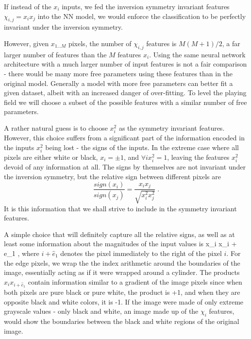 \documentclass{svproc}
\begin{document}
If instead of the $x_i$ inputs, we fed the inversion symmetry invariant features $\chi_{i,j} = x_i x_j$ into the NN model, we would enforce the classification to be perfectly invariant under the inversion symmetry.

However, given $x_{1 \ldots M}$ pixels, the number of $\chi_{i,j}$ features is $M(M+1)/2$, a far larger number of features than the $M$ features $x_i$. Using the same neural network architecture with a much larger number of input features is not a fair comparison - there would be many more free parameters using these features than in the original model. Generally a model with more free parameters can better fit a given dataset, albeit with an increased danger of over-fitting.
To level the playing field we will choose a subset of the possible features with a similar number of free parameters. 

A rather natural guess is to choose $x_i^2$ as the symmetry invariant features. However, this choice suffers from a significant part of the information encoded in the inputs $x_i^2$ being lost - the signs of the inputs. In the extreme case where all pixels are either white or black, $x_i = \pm 1$, and $\forall i x_i^2 = 1$, leaving the features $x_i^2$ devoid of any information at all. The signs by themselves are not invariant under the inversion symmetry, but the relative sign between different pixels are
\begin{equation}
\frac{sign(x_i)}{sign(x_j)} = \frac{x_i x_j}{\sqrt{x_i^2 x_j ^2}}
\; .
\end{equation}
It is this information that we shall strive to include in the symmetry invariant features.

A simple choice that will definitely capture all the relative signs, as well as at least some information about the magnitudes of the input values is
\be
x_i x_{i + {\hat e}_1}
\; ,
\ee
where $i + {\hat e}_1$ denotes the pixel immediately to the right of the pixel $i$. For the edge pixels, we wrap the the index arithmetic around the boundaries of the image, essentially acting as if it were wrapped around a cylinder. The products $x_i x_{i + {\hat e}_1}$ contain information similar to a gradient of the image pixels since when both pixels are pure black or pure white, the product is +1, and when they are opposite black and white colors, it is -1. If the image were made of only extreme grayscale values - only black and white, an image made up of the $\chi_i$ features, would show the boundaries between the black and white regions of the original image.
\end{document}
